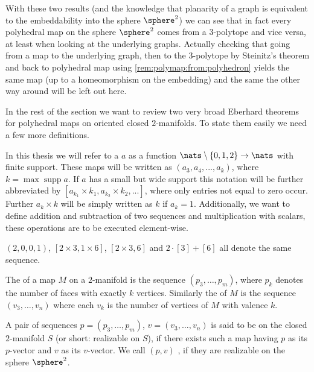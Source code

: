 With these two results (and the knowledge that planarity of a graph is equivalent to the embeddability into the sphere $\sphere^2$) we can see that in fact every polyhedral map on the sphere $\sphere^2$ comes from a $3$-polytope and vice versa, at least when looking at the underlying graphs. Actually checking that going from a map to the underlying graph, then to the $3$-polytope by {\sc Steinitz}'s theorem and back to polyhedral map using \autoref{rem:polymap:from:polyhedron} yields the same map (up to a homeomorphism on the embedding) and the same the other way around will be left out here.

\medskip\smallskip
In the rest of the section we want to review two very broad {\sc Eberhard} theorems for polyhedral maps on oriented closed $2$-manifolds. To state them easily we need a few more definitions.

\begin{definition}[Sequence]
  In this thesis we will refer to a  $a$ as a function \linebreak$\nats \setminus \{0, 1, 2\} \to \nats$ with finite support. These maps will be written as $(a_3, a_4, ..., a_k)$, where $k = \operatorname{max} \operatorname{supp} a$. If $a$ has a small but wide support this notation will be further abbreviated by $[a_{k_1} \times k_1, a_{k_2} \times k_2, ...]$, where only entries not equal to zero occur. Further $a_k \times k$ will be simply written as $k$ if $a_k = 1$. Additionally, we want to define addition and subtraction of two sequences and multiplication with scalars, these operations are to be executed element-wise.
\end{definition}
\begin{example}
  $(2, 0, 0, 1)$, $[2 \times 3, 1 \times 6]$, $[2 \times 3, 6]$ and $2 \cdot [3] + [6]$ all denote the same sequence.
\end{example}
\begin{definition}\label{def:vectors}
  The  of a map $M$ on a $2$-manifold is the sequence $(p_3, \dots, p_m)$, where $p_k$ denotes the number of faces with exactly $k$ vertices. Similarly the  of $M$ is the sequence $(v_3, \dots, v_n)$ where each $v_k$ is the number of vertices of $M$ with valence $k$.
\end{definition}

\begin{definition}\label{def:realizable}
  A pair of sequences $p = (p_3, \dots, p_m)$, $v = (v_3, \dots, v_n)$ is said to be  on the closed $2$-manifold $S$ (or short: realizable on $S$), if there exists such a map having $p$ as its $p$-vector and $v$ as its $v$-vector. We call $(p, v)$ , if they are realizable on the sphere $\sphere^2$.
\end{definition}

